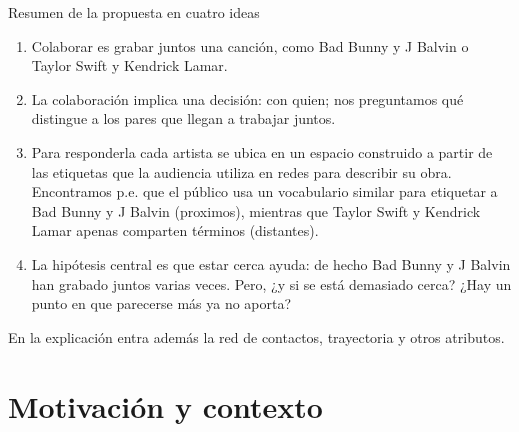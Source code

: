 \documentclass[
  8pt,
  ignorenonframetext,
  aspectratio=169,
  spanish,
]{beamer}
\providecommand{\tightlist}{%
  \setlength{\itemsep}{0pt}\setlength{\parskip}{0pt}}
\newcommand{\roadmapcontent}{}
\begin{document}
\begin{frame}{Resumen de la propuesta en cuatro ideas}
{\begin{enumerate}
\tightlist
\item
  Colaborar es grabar juntos una canción, como Bad Bunny y J Balvin o
  Taylor Swift y Kendrick Lamar.\\
\item
  La colaboración implica una decisión: con quien; nos preguntamos qué
  distingue a los pares que llegan a trabajar juntos.\\
\item
  Para responderla cada artista se ubica en un espacio construido a
  partir de las etiquetas que la audiencia utiliza en redes para
  describir su obra. Encontramos p.e. que el público usa un vocabulario
  similar para etiquetar a Bad Bunny y J Balvin (proximos), mientras que
  Taylor Swift y Kendrick Lamar apenas comparten términos (distantes).
\item
  La hipótesis central es que estar cerca ayuda: de hecho Bad Bunny y J
  Balvin han grabado juntos varias veces. Pero, ¿y si se está demasiado
  cerca? ¿Hay un punto en que parecerse más ya no aporta?
\end{enumerate}

En la explicación entra además la red de contactos, trayectoria y otros
atributos.}

\gdef\roadmapcontent{{\scriptsize \mbox{\color{black!40}Parte 1 · Currículum}\quad \mbox{\color{black!40}Parte 2 · Propuesta docente}\quad \mbox{\color{mDarkTeal}\bfseries Parte 3 · Propuesta investigadora: Creative collaborations}\par}
\vspace{0.8em}
{\large \mbox{\color{mDarkTeal}\bfseries Motivación y contexto}~· \mbox{\color{black!40}Datos y diseño}~· \mbox{\color{black!40}Resultados}~· \mbox{\color{black!40}Conclusiones}\par}}
\end{frame}

\section{Motivación y contexto}\label{motivaciuxf3n-y-contexto}

\end{document}
